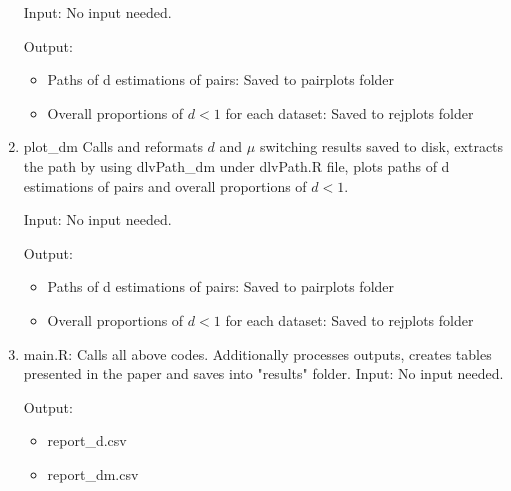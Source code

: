 \documentclass{article}
\begin{document}
\begin{enumerate}
	Input: No input needed.
	
	Output:
	\begin{itemize}
		\item Paths of d estimations of pairs: Saved to pairplots folder
		\item Overall proportions of $ d < 1 $ for each dataset: Saved to rejplots folder
	\end{itemize} 
	
	\item plot\_dm Calls and reformats $ d $ and $ \mu $ switching results saved to disk, extracts the path by using dlvPath\_dm under dlvPath.R file, plots paths of d estimations of pairs and overall proportions of $ d < 1 $.
		
	Input: No input needed.

	Output:
	\begin{itemize}
		\item Paths of d estimations of pairs: Saved to pairplots folder
		\item Overall proportions of $ d < 1 $ for each dataset: Saved to rejplots folder
	\end{itemize} 


	\item main.R: Calls all above codes. Additionally processes outputs, creates tables presented in the paper and saves into "results" folder.
	Input: No input needed.
	
	Output:
	\begin{itemize}
		\item report\_d.csv
		\item report\_dm.csv
	\end{itemize}
	
\end{enumerate}
\end{document}
